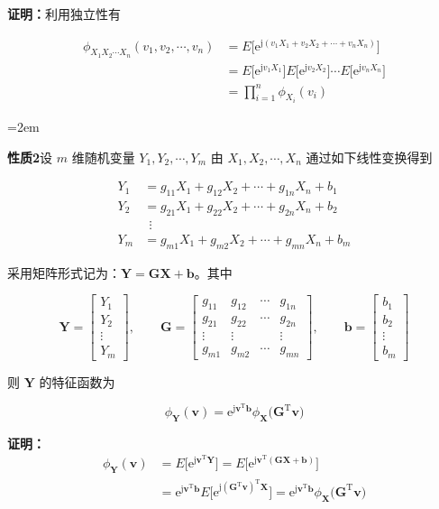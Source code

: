 \documentclass[11pt,openany,UTF8]{ctexbook}
\newcommand{\eu}{\mathrm{e}}                       %
\newcommand{\ju}{\mathrm{j}}                       %
\newcommand{\thm}[1]{\par\medskip\noindent\textbf{#1}\quad}
\begin{document}
\textbf{证明\nobreak：}利用独立性有

\[
\begin{aligned}
\phi_{X_1X_2\cdots X_n}(v_1,v_2,\cdots,v_n)
  &=E\bigl[\eu^{\ju(v_1X_1+v_2X_2+\cdots+v_nX_n)}\bigr]\\
  &=E\bigl[\eu^{\ju v_1X_1}\bigr]E\bigl[\eu^{\ju v_2X_2}\bigr]\cdots E\bigl[\eu^{\ju v_nX_n}\bigr]\\
  &=\prod_{i=1}^{n}\phi_{X_i}(v_i)
\end{aligned}
\]

{\emergencystretch=2em \thm{性质2}设 $m$ 维随机变量 $Y_1,Y_2,\cdots,Y_m$ 由 $X_1,X_2,\cdots,X_n$ 通过如下线性变换得到\par}

\[
\begin{aligned}
Y_1&=g_{11}X_1+g_{12}X_2+\cdots+g_{1n}X_n+b_1\\
Y_2&=g_{21}X_1+g_{22}X_2+\cdots+g_{2n}X_n+b_2\\
   &\ \ \vdots\\
Y_m&=g_{m1}X_1+g_{m2}X_2+\cdots+g_{mn}X_n+b_m
\end{aligned}
\]

采用矩阵形式记为\nobreak：$\bm{Y}=\bm{G}\bm{X}+\bm{b}$\nobreak。其中

\[
\bm{Y}=\begin{bmatrix}Y_1\\Y_2\\\vdots\\Y_m\end{bmatrix},\qquad
\bm{G}=\begin{bmatrix}
g_{11} & g_{12} & \cdots & g_{1n}\\
g_{21} & g_{22} & \cdots & g_{2n}\\
\vdots & \vdots &        & \vdots\\
g_{m1} & g_{m2} & \cdots & g_{mn}
\end{bmatrix},\qquad
\bm{b}=\begin{bmatrix}b_1\\b_2\\\vdots\\b_m\end{bmatrix}
\]

则 $\bm{Y}$ 的特征函数为

\begin{equation}
\phi_{\bm{Y}}(\bm{v})=\eu^{\ju\bm{v}^{\mathrm{T}}\bm{b}}\phi_{\bm{X}}\bigl(\bm{G}^{\mathrm{T}}\bm{v}\bigr)
\label{eq:1.68}
\end{equation}

\textbf{证明\nobreak：}
\[
\begin{aligned}
\phi_{\bm{Y}}(\bm{v})&=E\bigl[\eu^{\ju\bm{v}^{\mathrm{T}}\bm{Y}}\bigr]
 =E\bigl[\eu^{\ju\bm{v}^{\mathrm{T}}(\bm{G}\bm{X}+\bm{b})}\bigr]\\
&=\eu^{\ju\bm{v}^{\mathrm{T}}\bm{b}}E\bigl[\eu^{\ju(\bm{G}^{\mathrm{T}}\bm{v})^{\mathrm{T}}\bm{X}}\bigr]
 =\eu^{\ju\bm{v}^{\mathrm{T}}\bm{b}}\phi_{\bm{X}}\bigl(\bm{G}^{\mathrm{T}}\bm{v}\bigr)
\end{aligned}
\]
\end{document}
